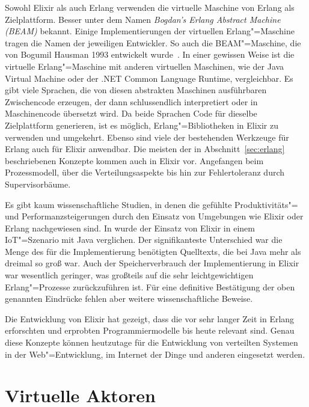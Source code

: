 Sowohl Elixir als auch Erlang verwenden die virtuelle  Maschine von Erlang als Zielplattform. Besser unter dem Namen \textit{Bogdan's Erlang Abstract Machine (BEAM)} bekannt. Einige Implementierungen der virtuellen Erlang"=Maschine tragen die Namen der jeweiligen Entwickler. So auch die BEAM"=Maschine, die von Bogumil Hausman 1993 entwickelt wurde~\cite[12]{Armstrong:2007:HE:1238844.1238850}. In einer gewissen Weise ist die virtuelle Erlang"=Maschine mit anderen virtuellen Maschinen, wie der Java Virtual Machine oder der .NET Common Language Runtime, vergleichbar. Es gibt viele Sprachen, die von diesen abstrakten Maschinen ausführbaren Zwischencode erzeugen, der dann schlussendlich interpretiert oder in Maschinencode übersetzt wird.
Da beide Sprachen Code für dieselbe Zielplattform generieren, ist es möglich, Erlang"=Bibliotheken in Elixir zu verwenden und umgekehrt. Ebenso sind viele der bestehenden Werkzeuge für Erlang auch für Elixir anwendbar. Die meisten der in Abschnitt~\ref{sec:erlang} beschriebenen Konzepte kommen auch in Elixir vor. Angefangen beim Prozessmodell, über die Verteilungsaspekte bis hin zur Fehlertoleranz durch Supervisorbäume.

Es gibt kaum wissenschaftliche Studien, in denen die gefühlte Produktivitäts"= und Performanzsteigerungen durch den Einsatz von Umgebungen wie Elixir oder Erlang nachgewiesen sind. In \cite{ElixirIot} wurde der Einsatz von Elixir in einem IoT"=Szenario mit Java verglichen. Der signifikanteste Unterschied war die Menge des für die Implementierung benötigten Quelltexts, die bei Java mehr als dreimal so groß war. Auch der Speicherverbrauch der Implementierung in Elixir war wesentlich geringer, was großteils auf die sehr leichtgewichtigen Erlang"=Prozesse zurückzuführen ist. Für eine definitive Bestätigung der oben genannten Eindrücke fehlen aber weitere wissenschaftliche Beweise.

Die Entwicklung von Elixir hat gezeigt, dass die vor sehr langer Zeit in Erlang erforschten und erprobten Programmiermodelle bis heute relevant sind. Genau diese Konzepte können heutzutage für die Entwicklung von verteilten Systemen in der Web"=Entwicklung, im Internet der Dinge und anderen eingesetzt werden.

\section{Virtuelle Aktoren}

